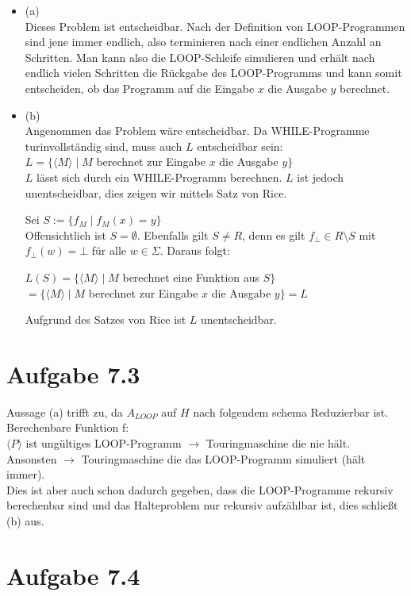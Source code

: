 \documentclass{article}
\begin{document}
\begin{itemize}
\item (a)\\
Dieses Problem ist entscheidbar. Nach der Definition von LOOP-Programmen sind jene immer endlich, also terminieren nach einer endlichen Anzahl an Schritten. Man kann also die LOOP-Schleife simulieren und erhält nach endlich vielen Schritten die Rückgabe des LOOP-Programms und kann somit entscheiden, ob das Programm auf die Eingabe $x$ die Ausgabe $y$ berechnet.

\item (b)\\
Angenommen das Problem wäre entscheidbar. Da WHILE-Programme turinvollständig sind, muss auch $L$ entscheidbar sein:\\

$L=\{\langle M \rangle \mid M$ berechnet zur Eingabe $x$ die Ausgabe $y \}$\\

$L$ lässt sich durch ein WHILE-Programm berechnen. $L$ ist  jedoch unentscheidbar, dies zeigen wir mittels Satz von Rice.

Sei $S:=\{f_M \mid f_M(x) = y \}$\\

Offensichtlich ist $S=\emptyset$. Ebenfalls gilt $S \neq R$, denn es gilt $f_{\bot} \in R \setminus S$ mit $f_{\bot}(w)=\bot$ für alle $w \in \Sigma$. Daraus folgt:\\

\begin{center}
$L(S) = \{ \langle M \rangle \mid M$ berechnet eine Funktion aus $S \}$\\
 $= \{ \langle M \rangle \mid M$ berechnet zur Eingabe $x$ die Ausgabe $y \} = L$\\
\end{center}

Aufgrund des Satzes von Rice ist $L$ unentscheidbar.
\end{itemize}
	
	\section[a 7.3]{Aufgabe 7.3}
	Aussage (a) trifft zu, da $A_{LOOP}$ auf $H$ nach folgendem schema Reduzierbar ist. \\
	Berechenbare Funktion f:\\
	$\langle P \rangle$ ist ungültiges LOOP-Programm $\rightarrow$ Touringmaschine die nie hält.\\
	Ansonsten $\rightarrow$ Touringmaschine die das LOOP-Programm simuliert (hält immer).\\
	Dies ist aber auch schon dadurch gegeben, dass die LOOP-Programme rekursiv berechenbar sind und das Halteproblem nur rekursiv aufzählbar ist, dies schließt (b) aus.
	\section[a 7.4]{Aufgabe 7.4}
	
\end{document}
